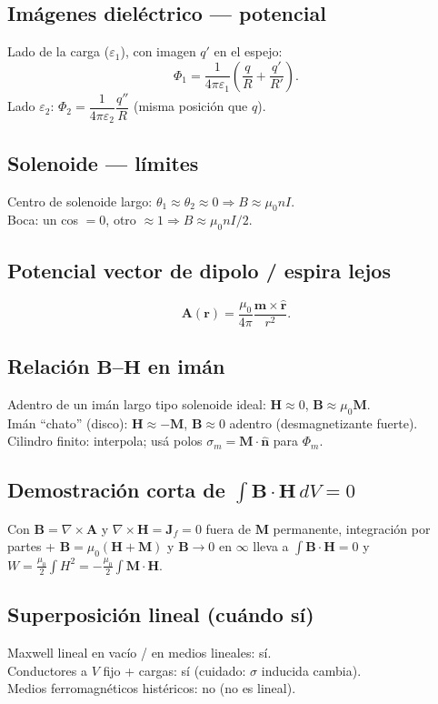 \documentclass[10pt,a4paper]{article}
\newcommand{\vect}[1]{\mathbf{#1}}
\newcommand{\uv}[1]{\hat{\mathbf{#1}}}
\newcommand{\eps}{\varepsilon}
\newcommand{\muo}{\mu_0}
\begin{document}
\subsection{Imágenes dieléctrico --- potencial}
Lado de la carga ($\eps_1$), con imagen $q'$ en el espejo:
\[
\Phi_1=\frac{1}{4\pi\eps_1}\left(\frac{q}{R}+\frac{q'}{R'}\right).
\]
Lado $\eps_2$: $\Phi_2=\dfrac{1}{4\pi\eps_2}\dfrac{q''}{R}$ (misma posición que $q$).

\subsection{Solenoide --- límites}
Centro de solenoide largo: $\theta_1\approx\theta_2\approx 0\Rightarrow B\approx\muo n I$.\\
Boca: un cos $=0$, otro $\approx 1\Rightarrow B\approx\muo n I/2$.

\subsection{Potencial vector de dipolo / espira lejos}
\[
\vect{A}(\vect{r})=\frac{\muo}{4\pi}\frac{\vect{m}\times\uv{r}}{r^2}.
\]

\subsection{Relación $\vect{B}$--$\vect{H}$ en imán}
Adentro de un imán largo tipo solenoide ideal: $\vect{H}\approx 0$, $\vect{B}\approx\muo\vect{M}$.\\
Imán ``chato'' (disco): $\vect{H}\approx-\vect{M}$, $\vect{B}\approx 0$ adentro (desmagnetizante fuerte).\\
Cilindro finito: interpola; usá polos $\sigma_m=\vect{M}\cdot\uv{n}$ para $\Phi_m$.

\subsection{Demostración corta de $\int\vect{B}\cdot\vect{H}\,dV=0$}
Con $\vect{B}=\nabla\times\vect{A}$ y $\nabla\times\vect{H}=\vect{J}_f=0$ fuera de $\vect{M}$ permanente, integración por partes + $\vect{B}=\muo(\vect{H}+\vect{M})$ y $\vect{B}\to 0$ en $\infty$ lleva a
$\int\vect{B}\cdot\vect{H}=0$ y $W=\frac{\muo}{2}\int H^2=-\frac{\muo}{2}\int\vect{M}\cdot\vect{H}$.

\subsection{Superposición lineal (cuándo sí)}
Maxwell lineal en vacío / en medios lineales: sí.\\
Conductores a $V$ fijo + cargas: sí (cuidado: $\sigma$ inducida cambia).\\
Medios ferromagnéticos histéricos: no (no es lineal).
\end{document}
